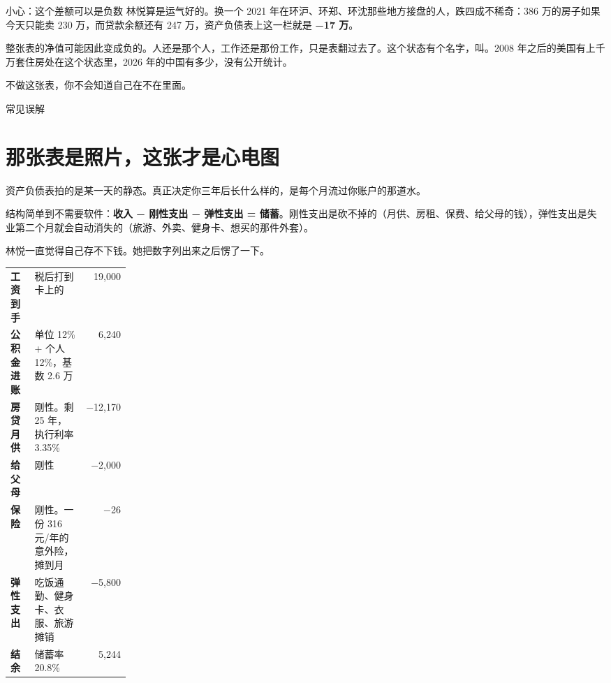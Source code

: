 \begin{warnbox}{小心：这个差额可以是负数}
林悦算是运气好的。换一个 2021 年在环沪、环郑、环沈那些地方接盘的人，跌四成不稀奇：386 万的房子如果今天只能卖 230 万，而贷款余额还有 247 万，资产负债表上这一栏就是 \textbf{−17 万}。

整张表的净值可能因此变成负的。人还是那个人，工作还是那份工作，只是表翻过去了。这个状态有个名字，叫。2008 年之后的美国有上千万套住房处在这个状态里，2026 年的中国有多少，没有公开统计。

不做这张表，你不会知道自己在不在里面。

\end{warnbox}

\begin{mythbox}{常见误解}
\end{mythbox}

\section{那张表是照片，这张才是心电图}

资产负债表拍的是某一天的静态。真正决定你三年后长什么样的，是每个月流过你账户的那道水。

结构简单到不需要软件：\textbf{收入 − 刚性支出 − 弹性支出 = 储蓄}。刚性支出是砍不掉的（月供、房租、保费、给父母的钱），弹性支出是失业第二个月就会自动消失的（旅游、外卖、健身卡、想买的那件外套）。

林悦一直觉得自己存不下钱。她把数字列出来之后愣了一下。

\begin{tablewrap}
\begin{xltabular}{\linewidth}{>{\raggedright\arraybackslash}p{0.20\linewidth}Xr}
\toprule
{} &  &  \\
\midrule
\textbf{工资到手} & 税后打到卡上的 & 19,000 \\
\textbf{公积金进账} & 单位 12\% + 个人 12\%，基数 2.6 万 & 6,240 \\
\textbf{房贷月供} & 刚性。剩 25 年，执行利率 3.35\% & −12,170 \\
\textbf{给父母} & 刚性 & −2,000 \\
\textbf{保险} & 刚性。一份 316 元/年的意外险，摊到月 & −26 \\
\textbf{弹性支出} & 吃饭通勤、健身卡、衣服、旅游摊销 & −5,800 \\
\textbf{结余} & 储蓄率 20.8\% & 5,244 \\
\bottomrule
\end{xltabular}
\end{tablewrap}

